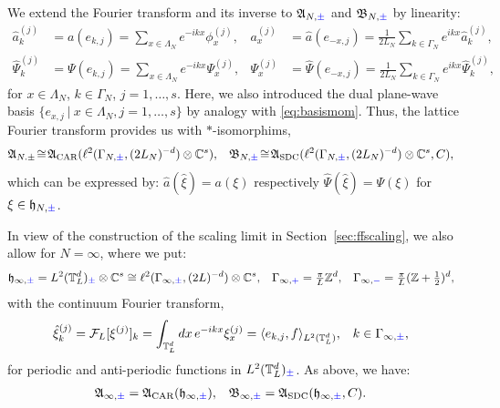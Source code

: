 \documentclass[a4paper, 11pt]{article}
\newcommand{\fA}{\mathfrak{A}}\newcommand{\cA}{\mathcal{A}}\newcommand{\dA}{\mathds{A}}\newcommand{\sA}{\mathscr{A}}
\newcommand{\fB}{\mathfrak{B}}\newcommand{\cB}{\mathcal{B}}\newcommand{\dB}{\mathds{B}}\newcommand{\sB}{\mathscr{B}}
\newcommand{\fh}{\mathfrak{h}}
\newcommand{\ltwo}{\ell^{2}}
\DeclareMathOperator{\1}{\mathds{1}}
\DeclareMathOperator{\CAR}{\textup{CAR}}
\DeclareMathOperator{\SDC}{\textup{SDC}}
\begin{document}
We extend the Fourier transform and its inverse to $\fA_{N, {\color{blue}\pm}}$ and $\fB_{N, {\color{blue}\pm}}$ by linearity:
\begin{align}
\label{eq:Ffields}
\hat{a}^{(j)}_{k} & = a(e_{k,j}) = \sum_{x\in\Lambda_{N}}e^{-ikx}\phi^{(j)}_{x}, & a^{(j)}_{x} & = \hat{a}(e_{-x,j}) = \tfrac{1}{2L_{N}}\sum_{k\in\Gamma_{N}}e^{ikx}\hat{a}^{(j)}_{k},  \\ \nonumber
\hat{\Psi}^{(j)}_{k} & = \Psi(e_{k,j}) = \sum_{x\in\Lambda_{N}}e^{-ikx}\Psi^{(j)}_{x}, & \Psi^{(j)}_{x} & = \hat{\Psi}(e_{-x,j}) = \tfrac{1}{2L_{N}}\sum_{k\in\Gamma_{N}}e^{ikx}\hat{\Psi}^{(j)}_{k},
\end{align}
for $x\in\Lambda_{N}$, $k\in\Gamma_{N}$, $j =1,\dots,s$. Here, we also introduced the dual plane-wave basis $\{e_{x,j}\ |\ x\in\Lambda_{N}, j=1,\dots,s\}$ by analogy with \eqref{eq:basismom}. Thus, the lattice Fourier transform provides us with $*$-isomorphims,
\begin{align}
\label{eq:Ffermi}
\fA_{N.\pm} &\!\cong\!\fA_{\CAR}(\ltwo(\Gamma_{N,{\color{blue}\pm}},(2L_{N})^{-d})\otimes\C^{s}), & \fB_{N,{\color{blue}\pm}} &\!\cong\!\fA_{\SDC}(\ltwo(\Gamma_{N,{\color{blue}\pm}},(2L_{N})^{-d})\otimes\C^{s},C),
\end{align}
which can be expressed by: $\hat{a}(\hat{\xi}) = a(\xi)$ respectively $\hat{\Psi}(\hat{\xi}) = \Psi(\xi)$ for $\xi\in\fh_{N,{\color{blue}\pm}}$.

In view of the construction of the scaling limit in Section \ref{sec:ffscaling}, we also allow for $N=\infty$, where we put:
\begin{align}
\label{eq:1pcont}
\fh_{\infty,{\color{blue}\pm}} & = L^{2}(\T^{d}_{L})_{{\color{blue}\pm}}\otimes\C^{s}\cong\ltwo(\Gamma_{\infty,{\color{blue}\pm}},(2L)^{-d})\otimes\C^{s}, & \Gamma_{\infty,{\color{blue}+}} & = \tfrac{\pi}{L}\Z^{d}, & \Gamma_{\infty,{\color{blue}-}} & = \tfrac{\pi}{L}(\Z+\tfrac{1}{2})^{d},
\end{align}
with the continuum Fourier transform,
\begin{align}
\label{eq:contF}
\hat{\xi}^{(j)}_{k} & = \mathcal{F}_{L}[\xi^{(j)}]_{k} = \int_{\mathbb{T}^{d}_{L}}dx\!\ e^{-ikx}\xi^{(j)}_{x} = \langle e_{k,j}, f\rangle_{L^{2}(\mathbb{T}^{d}_{L})}, & k & \in\Gamma_{\infty,{\color{blue}\pm}},
\end{align}
for periodic and anti-periodic functions in $L^{2}(\mathbb{T}^{d}_{L})_{{\color{blue}\pm}}$. As above, we have:
\begin{align}
\label{eq:contfermi}
\fA_{\infty,{\color{blue}\pm}} & = \fA_{\CAR}(\fh_{\infty,{\color{blue}\pm}}), & \fB_{\infty,{\color{blue}\pm}} & = \fA_{\SDC}(\fh_{\infty,{\color{blue}\pm}},C). 
\end{align}
\end{document}
